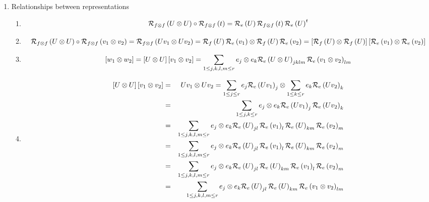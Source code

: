 \begin{remark}

\begin{enumerate}
\item Relationships between representations 

\begin{enumerate}
\item 
\begin{equation}
{\cal R}_{f\otimes f}\left( U\otimes U\right) \circ {\cal R}_{f\otimes
f}\left( t\right) ={\cal R}_{e}\left( U\right) {\cal R}_{f\otimes f}\left(
t\right) {\cal R}_{e}\left( U\right) ^{t}
\end{equation}

\item 
\begin{equation}
{\cal R}_{f\otimes f}\left( U\otimes U\right) \circ {\cal R}_{f\otimes
f}\left( v_{1}\otimes v_{2}\right) ={\cal R}_{f\otimes f}\left(
Uv_{1}\otimes Uv_{2}\right) ={\cal R}_{f}\left( U\right) {\cal R}_{e}\left(
v_{1}\right) \otimes {\cal R}_{f}\left( U\right) {\cal R}_{e}\left(
v_{2}\right) =\left[ {\cal R}_{f}\left( U\right) \otimes {\cal R}_{f}\left(
U\right) \right] \left[ {\cal R}_{e}\left( v_{1}\right) \otimes {\cal R}%
_{e}\left( v_{2}\right) \right] 
\end{equation}

\item 
\begin{equation}
\left[ w_{1}\otimes w_{2}\right] =\left[ U\otimes U\right] \left[
v_{1}\otimes v_{2}\right] =\sum_{1\leq j,k,l,m\leq r}e_{j}\otimes e_{k}{\cal %
R}_{e}\left( U\otimes U\right) _{jklm}{\cal R}_{e}\left( v_{1}\otimes
v_{2}\right) _{lm}
\end{equation}

\item 
\begin{eqnarray}
\left[ U\otimes U\right] \left[ v_{1}\otimes v_{2}\right]  &=&Uv_{1}\otimes
Uv_{2}=\sum_{1\leq j\leq r}e_{j}{\cal R}_{e}\left( Uv_{1}\right) _{j}\otimes
\sum_{1\leq k\leq r}e_{k}{\cal R}_{e}\left( Uv_{2}\right) _{k} \\
&=&\sum_{1\leq j,k\leq r}e_{j}\otimes e_{k}{\cal R}_{e}\left( Uv_{1}\right)
_{j}{\cal R}_{e}\left( Uv_{2}\right) _{k} \\
&=&\sum_{1\leq j,k,l,m\leq r}e_{j}\otimes e_{k}{\cal R}_{e}\left( U\right)
_{jl}{\cal R}_{e}\left( v_{1}\right) _{l}{\cal R}_{e}\left( U\right) _{km}%
{\cal R}_{e}\left( v_{2}\right) _{m} \\
&=&\sum_{1\leq j,k,l,m\leq r}e_{j}\otimes e_{k}{\cal R}_{e}\left( U\right)
_{jl}{\cal R}_{e}\left( v_{1}\right) _{l}{\cal R}_{e}\left( U\right) _{km}%
{\cal R}_{e}\left( v_{2}\right) _{m} \\
&=&\sum_{1\leq j,k,l,m\leq r}e_{j}\otimes e_{k}{\cal R}_{e}\left( U\right)
_{jl}{\cal R}_{e}\left( U\right) _{km}{\cal R}_{e}\left( v_{1}\right) _{l}%
{\cal R}_{e}\left( v_{2}\right) _{m} \\
&=&\sum_{1\leq j,k,l,m\leq r}e_{j}\otimes e_{k}{\cal R}_{e}\left( U\right)
_{jl}{\cal R}_{e}\left( U\right) _{km}{\cal R}_{e}\left( v_{1}\otimes
v_{2}\right) _{lm}
\end{eqnarray}


\end{enumerate}
\end{enumerate}
\end{remark}
